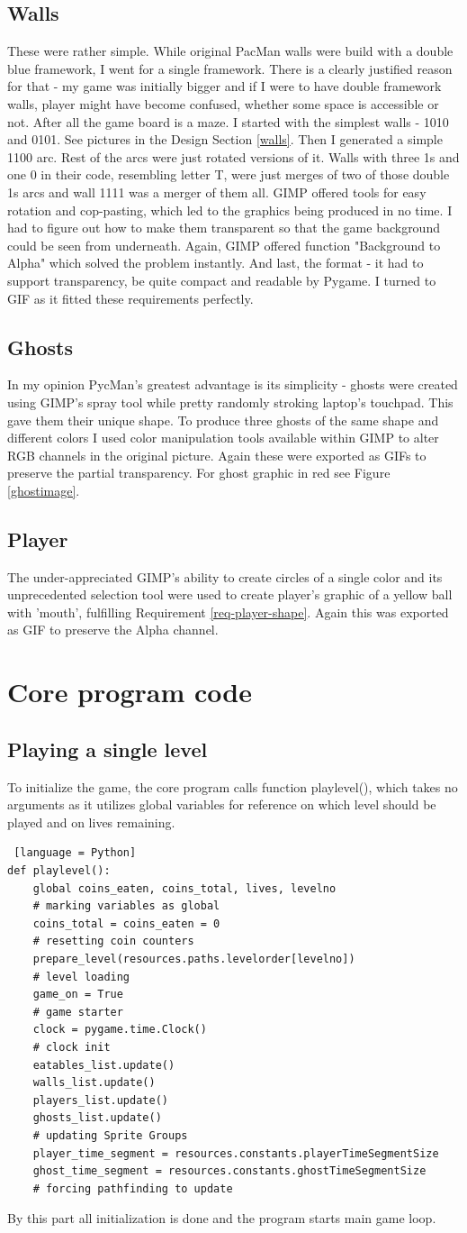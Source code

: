\documentclass[11pt,a4paper,notitlepage]{report}
\newcommand{\dsubsection}[1]{\FloatBarrier \subsection{#1}}
\begin{document}
			\dsubsection{Walls}
				These were rather simple. While original PacMan walls were build with a double blue framework, I went for a single framework. There is a clearly justified reason for that - my game was initially bigger and if I were to have double framework walls, player might have become confused, whether some space is accessible or not. After all the game board is a maze. I started with the simplest walls - 1010 and 0101. See pictures in the Design Section \ref{walls}. Then I generated a simple 1100 arc. Rest of the arcs were just rotated versions of it. Walls with three 1s and one 0 in their code, resembling letter T, were just merges of two of those double 1s arcs and wall 1111 was a merger of them all. GIMP offered tools for easy rotation and cop-pasting, which led to the graphics being produced in no time. I had to figure out how to make them transparent so that the game background could be seen from underneath. Again, GIMP offered function "Background to Alpha" which solved the problem instantly. And last, the format - it had to support transparency, be quite compact and readable by Pygame. I turned to GIF as it fitted these requirements perfectly.
			\dsubsection{Ghosts}
				In my opinion PycMan's greatest advantage is its simplicity - ghosts were created using GIMP's spray tool while pretty randomly stroking laptop's touchpad. This gave them their unique shape. To produce three ghosts of the same shape and different colors I used color manipulation tools available within GIMP to alter RGB channels in the original picture. Again these were exported as GIFs to preserve the partial transparency. For ghost graphic in red see Figure \ref{ghostimage}.
			\dsubsection{Player}
				The under-appreciated GIMP's ability to create circles of a single color and its unprecedented selection tool were used to create player's graphic of a yellow ball with 'mouth', fulfilling Requirement \ref{req-player-shape}. Again this was exported as GIF to preserve the Alpha channel.
		\section{Core program code}
			\dsubsection{Playing a single level}
				To initialize the game, the core program calls function playlevel(), which takes no arguments as it utilizes global variables for reference on which level should be played and on lives remaining.
				\begin{lstlisting} [language = Python]
def playlevel():
	global coins_eaten, coins_total, lives, levelno
	# marking variables as global
	coins_total = coins_eaten = 0
	# resetting coin counters
	prepare_level(resources.paths.levelorder[levelno])
	# level loading
	game_on = True
	# game starter
	clock = pygame.time.Clock()
	# clock init
	eatables_list.update()
	walls_list.update()
	players_list.update()
	ghosts_list.update()
	# updating Sprite Groups
	player_time_segment = resources.constants.playerTimeSegmentSize
	ghost_time_segment = resources.constants.ghostTimeSegmentSize
	# forcing pathfinding to update
				\end{lstlisting}
				By this part all initialization is done and the program starts main game loop.
\end{document}
